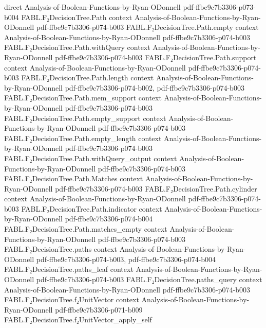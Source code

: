 \begin{theorem}
  {direct}
  {Analysis-of-Boolean-Functions-by-Ryan-ODonnell}
  {pdf-ffbe9c7b3306-p073-b004}
\proofstep
  {FABL.F₂DecisionTree.Path}
  {context}
  {Analysis-of-Boolean-Functions-by-Ryan-ODonnell}
  {pdf-ffbe9c7b3306-p074-b003}
\proofstep
  {FABL.F₂DecisionTree.Path.empty}
  {context}
  {Analysis-of-Boolean-Functions-by-Ryan-ODonnell}
  {pdf-ffbe9c7b3306-p074-b003}
\proofstep
  {FABL.F₂DecisionTree.Path.withQuery}
  {context}
  {Analysis-of-Boolean-Functions-by-Ryan-ODonnell}
  {pdf-ffbe9c7b3306-p074-b003}
\proofstep
  {FABL.F₂DecisionTree.Path.support}
  {context}
  {Analysis-of-Boolean-Functions-by-Ryan-ODonnell}
  {pdf-ffbe9c7b3306-p074-b003}
\proofstep
  {FABL.F₂DecisionTree.Path.length}
  {context}
  {Analysis-of-Boolean-Functions-by-Ryan-ODonnell}
  {pdf-ffbe9c7b3306-p074-b002,
    pdf-ffbe9c7b3306-p074-b003}
\proofstep
  {FABL.F₂DecisionTree.Path.mem_support}
  {context}
  {Analysis-of-Boolean-Functions-by-Ryan-ODonnell}
  {pdf-ffbe9c7b3306-p074-b003}
\proofstep
  {FABL.F₂DecisionTree.Path.empty_support}
  {context}
  {Analysis-of-Boolean-Functions-by-Ryan-ODonnell}
  {pdf-ffbe9c7b3306-p074-b003}
\proofstep
  {FABL.F₂DecisionTree.Path.empty_length}
  {context}
  {Analysis-of-Boolean-Functions-by-Ryan-ODonnell}
  {pdf-ffbe9c7b3306-p074-b003}
\proofstep
  {FABL.F₂DecisionTree.Path.withQuery_output}
  {context}
  {Analysis-of-Boolean-Functions-by-Ryan-ODonnell}
  {pdf-ffbe9c7b3306-p074-b003}
\proofstep
  {FABL.F₂DecisionTree.Path.Matches}
  {context}
  {Analysis-of-Boolean-Functions-by-Ryan-ODonnell}
  {pdf-ffbe9c7b3306-p074-b003}
\proofstep
  {FABL.F₂DecisionTree.Path.cylinder}
  {context}
  {Analysis-of-Boolean-Functions-by-Ryan-ODonnell}
  {pdf-ffbe9c7b3306-p074-b003}
\proofstep
  {FABL.F₂DecisionTree.Path.indicator}
  {context}
  {Analysis-of-Boolean-Functions-by-Ryan-ODonnell}
  {pdf-ffbe9c7b3306-p074-b004}
\proofstep
  {FABL.F₂DecisionTree.Path.matches_empty}
  {context}
  {Analysis-of-Boolean-Functions-by-Ryan-ODonnell}
  {pdf-ffbe9c7b3306-p074-b003}
\proofstep
  {FABL.F₂DecisionTree.paths}
  {context}
  {Analysis-of-Boolean-Functions-by-Ryan-ODonnell}
  {pdf-ffbe9c7b3306-p074-b003,
    pdf-ffbe9c7b3306-p074-b004}
\proofstep
  {FABL.F₂DecisionTree.paths_leaf}
  {context}
  {Analysis-of-Boolean-Functions-by-Ryan-ODonnell}
  {pdf-ffbe9c7b3306-p074-b003}
\proofstep
  {FABL.F₂DecisionTree.paths_query}
  {context}
  {Analysis-of-Boolean-Functions-by-Ryan-ODonnell}
  {pdf-ffbe9c7b3306-p074-b003}
\proofstep
  {FABL.F₂DecisionTree.f₂UnitVector}
  {context}
  {Analysis-of-Boolean-Functions-by-Ryan-ODonnell}
  {pdf-ffbe9c7b3306-p071-b009}
\proofstep
  {FABL.F₂DecisionTree.f₂UnitVector_apply_self}

\end{theorem}
